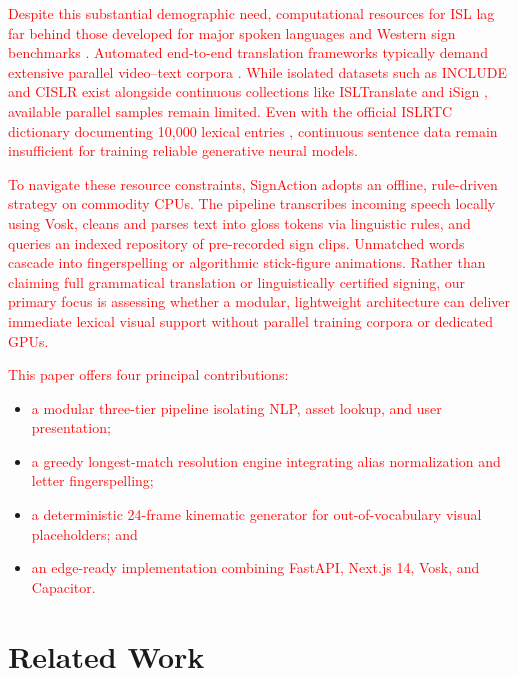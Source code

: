 \documentclass[conference,a4paper,10pt]{IEEEtran}
\begin{document}
\textcolor{red}{Despite this substantial demographic need, computational resources for ISL lag far behind those developed for major spoken languages and Western sign benchmarks \cite{joshi2024isign}. Automated end-to-end translation frameworks typically demand extensive parallel video--text corpora \cite{camgoz2020}. While isolated datasets such as INCLUDE \cite{sridhar2020} and CISLR \cite{joshi2022cislr} exist alongside continuous collections like ISLTranslate \cite{joshi2023isltranslate} and iSign \cite{joshi2024isign}, available parallel samples remain limited. Even with the official ISLRTC dictionary documenting 10{,}000 lexical entries \cite{islrtc2021}, continuous sentence data remain insufficient for training reliable generative neural models.}

\textcolor{red}{To navigate these resource constraints, SignAction adopts an offline, rule-driven strategy on commodity CPUs. The pipeline transcribes incoming speech locally using Vosk, cleans and parses text into gloss tokens via linguistic rules, and queries an indexed repository of pre-recorded sign clips. Unmatched words cascade into fingerspelling or algorithmic stick-figure animations. Rather than claiming full grammatical translation or linguistically certified signing, our primary focus is assessing whether a modular, lightweight architecture can deliver immediate lexical visual support without parallel training corpora or dedicated GPUs.}

\textcolor{red}{This paper offers four principal contributions:}
\begin{itemize}
    \item \textcolor{red}{a modular three-tier pipeline isolating NLP, asset lookup, and user presentation;}
    \item \textcolor{red}{a greedy longest-match resolution engine integrating alias normalization and letter fingerspelling;}
    \item \textcolor{red}{a deterministic 24-frame kinematic generator for out-of-vocabulary visual placeholders; and}
    \item \textcolor{red}{an edge-ready implementation combining FastAPI, Next.js 14, Vosk, and Capacitor.}
\end{itemize}

\section{Related Work}
\label{sec:related}
\end{document}
